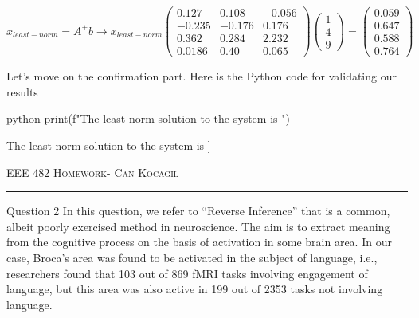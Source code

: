 \documentclass[12pt]{amsart}
\makeatletter
\def\section{\@startsection{section}{1}%
  \z@{.7\linespacing\@plus\linespacing}{.5\linespacing}%
  {\normalfont\scshape}}%
\makeatother
\begin{document}
\begin{equation*}
    x_{least-norm} = A^+b \rightarrow x_{least-norm} 
    \begin{pmatrix}
     0.127 & 0.108& -0.056 \\
     -0.235 & -0.176& 0.176 \\
     0.362 & 0.284& 2.232 \\
     0.0186 & 0.40& 0.065
    \end{pmatrix} 
    \begin{pmatrix}
    1\\
    4\\
    9
    \end{pmatrix} =
    \begin{pmatrix}
    0.059\\
    0.647\\
    0.588\\
    0.764
    \end{pmatrix}
\end{equation*}

Let’s move on the confirmation part. Here is the Python code for validating our results
\begin{mintedbox}{python}
print(f"The least norm solution to the system is ")
\end{mintedbox}



The least norm solution to the system is \newline
 [[0.05882353] \newline
 [0.64705882] \newline
 [0.58823529] \newline
 [0.76470588]]

\newpage
{\scshape EEE 482} \hfill {\scshape \large  Homework-\relax} \hfill {\scshape Can Kocagil}
\smallskip
\hrule

\section{Question 2}
In this question, we refer to “Reverse Inference” that is a common, albeit poorly exercised method in neuroscience. The aim is to extract meaning from the cognitive process on the basis of activation in some brain area. In our case, Broca’s area was found to be activated in the subject of language, i.e., researchers found that 103 out of 869 fMRI tasks involving engagement of language, but this area was also active in 199 out of 2353 tasks not involving language.
\end{document}

